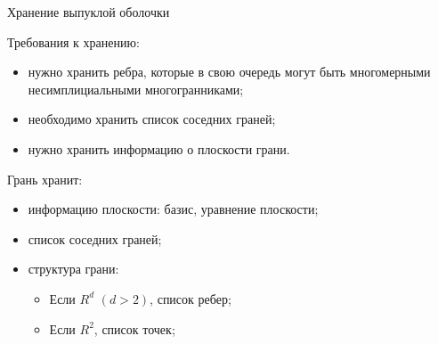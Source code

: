 \documentclass{beamer}
\begin{document}
\begin{frame}{Хранение выпуклой оболочки}

    Требования к хранению:
    \begin{itemize}
        \item нужно хранить ребра, которые в свою очередь могут быть многомерными несимплициальными многогранниками;
        \item необходимо хранить список соседних граней;
        \item нужно хранить информацию о плоскости грани.
    \end{itemize}

    \pause
    \vfill



    Грань хранит:
    \begin{itemize}
        \item информацию плоскости: базис, уравнение плоскости;
        \item список соседних граней;
        \item структура грани:
        \begin{itemize}
            \item Если $R^d$ $(d>2)$, список ребер;
            \item Если $R^2$, список точек;
        \end{itemize}
        \end{itemize}

\end{frame}



\end{document}
